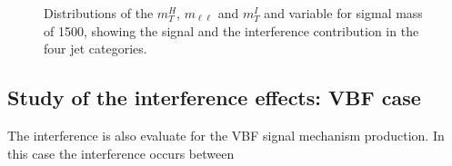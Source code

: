 \begin{figure}[htb]
\caption{
    Distributions of the  $m_T^H$, $m_{\ell \ell}$ and $m_T^I$ and  variable for sigmal mass of 1500\GeV, showing the signal and the interference contribution in the four jet categories.}
    \label{fig:1500}
\end{figure}






\subsection{Study of the interference effects: VBF case}
\label{sec:interference_VBF}
The interference is also evaluate for the VBF signal mechanism production. In this case the interference occurs between 
